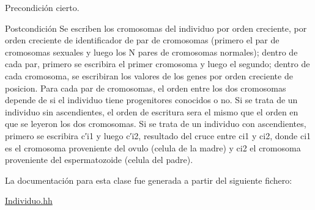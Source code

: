 \begin{DoxyPrecond}{Precondición}
cierto.
\end{DoxyPrecond}
\begin{DoxyPostcond}{Postcondición}
Se escriben los cromosomas del individuo por orden creciente, por orden creciente de identificador de par de cromosomas (primero el par de cromosomas sexuales y luego los N pares de cromosomas normales); dentro de cada par, primero se escribira el primer cromosoma y luego el segundo; dentro de cada cromosoma, se escribiran los valores de los genes por orden creciente de posicion. Para cada par de cromosomas, el orden entre los dos cromosomas depende de si el individuo tiene progenitores conocidos o no. Si se trata de un individuo sin ascendientes, el orden de escritura sera el mismo que el orden en que se leyeron los dos cromosomas. Si se trata de un individuo con ascendientes, primero se escribira c′i1 y luego c′i2, resultado del cruce entre ci1 y ci2, donde ci1 es el cromosoma proveniente del ovulo (celula de la madre) y ci2 el cromosoma proveniente del espermatozoide (celula del padre). 
\end{DoxyPostcond}


La documentación para esta clase fue generada a partir del siguiente fichero\+:\begin{DoxyCompactItemize}
\item 
\hyperlink{_individuo_8hh}{Individuo.\+hh}\end{DoxyCompactItemize}
